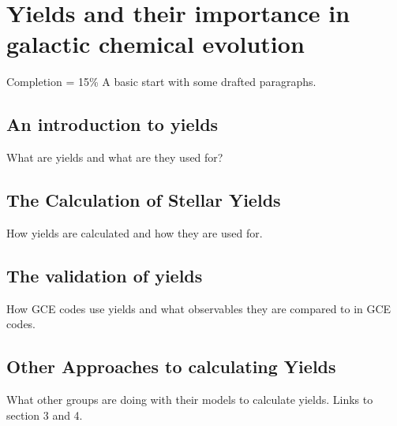 \chapter{Yields and their importance in galactic chemical evolution}

Completion = 15\%
A basic start with some drafted paragraphs.

\section{An introduction to yields}

What are yields and what are they used for?

\section{The Calculation of Stellar Yields}

How yields are calculated and how they are used for.

\section{The validation of yields}

How GCE codes use yields and what observables they are compared to in GCE codes.

\section{Other Approaches to calculating Yields}

What other groups are doing with their models to calculate yields. Links to section 3 and 4.
